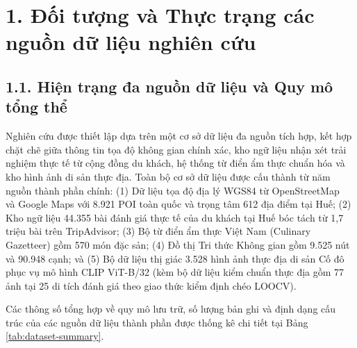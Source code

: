 \label{phan:phuong-phap}

\section*{1. Đối tượng và Thực trạng các nguồn dữ liệu nghiên cứu}
{}

\subsection*{1.1. Hiện trạng đa nguồn dữ liệu và Quy mô tổng thể}
{}

Nghiên cứu được thiết lập dựa trên một cơ sở dữ liệu đa nguồn tích hợp, kết hợp chặt chẽ giữa thông tin tọa độ không gian chính xác, kho ngữ liệu nhận xét trải nghiệm thực tế từ cộng đồng du khách, hệ thống từ điển ẩm thực chuẩn hóa và kho hình ảnh di sản thực địa. Toàn bộ cơ sở dữ liệu được cấu thành từ năm nguồn thành phần chính: (1) Dữ liệu tọa độ địa lý WGS84 từ OpenStreetMap~\cite{openstreetmap2024} và Google Maps với 8.921 POI toàn quốc và trọng tâm 612 địa điểm tại Huế; (2) Kho ngữ liệu 44.355 bài đánh giá thực tế của du khách tại Huế bóc tách từ 1,7 triệu bài trên TripAdvisor; (3) Bộ từ điển ẩm thực Việt Nam (Culinary Gazetteer) gồm 570 món đặc sản; (4) Đồ thị Tri thức Không gian gồm 9.525 nút và 90.948 cạnh; và (5) Bộ dữ liệu thị giác 3.528 hình ảnh thực địa di sản Cố đô phục vụ mô hình CLIP ViT-B/32 (kèm bộ dữ liệu kiểm chuẩn thực địa gồm 77 ảnh tại 25 di tích đánh giá theo giao thức kiểm định chéo LOOCV).

Các thông số tổng hợp về quy mô lưu trữ, số lượng bản ghi và định dạng cấu trúc của các nguồn dữ liệu thành phần được thống kê chi tiết tại Bảng \ref{tab:dataset-summary}.

